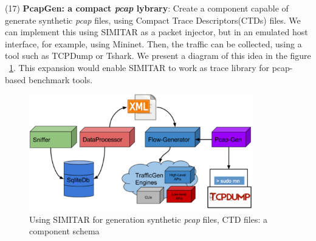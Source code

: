 (17) \textbf{PcapGen: a compact \textit{pcap} lybrary}: Create a component capable of generate synthetic \textit{pcap} files, using Compact Trace Descriptors(CTDs) files. We can implement this using SIMITAR as a packet injector, but in an emulated host interface, for example, using Mininet. Then, the traffic can be collected, using a tool such as TCPDump or Tshark. We present a diagram of this idea in the figure ~\ref{fig:pcap-gen}. This expansion would enable SIMITAR  to work as trace library for pcap-based benchmark tools.


\begin{figure}[!ht]
	\centering
	\includegraphics[height=2.0in]{figures/ch6/pcap-gen}
	\caption{Using SIMITAR for generation synthetic \textit{pcap} files, CTD files: a component schema}
	\label{fig:pcap-gen}
\end{figure}
	





